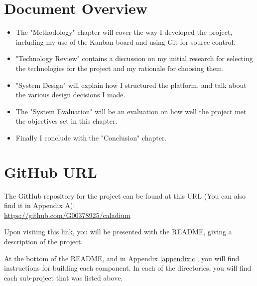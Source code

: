 
\section{Document Overview}
\begin{itemize}
  \item The "Methodology" chapter will cover the way I developed the project,
  including my use of the Kanban board and using Git for source control.
  \item "Technology Review" contains a discussion on my initial research for selecting
  the technologies for the project and my rationale for choosing them.
  \item "System Design" will explain how I structured the platform,
  and talk about the various design decisions I made.
  \item The "System Evaluation" will be an evaluation on how well
  the project met the objectives set in this chapter.
  \item Finally I conclude with the "Conclusion" chapter.
\end{itemize}

\section{GitHub URL}
The GitHub repository for the project can be found at this URL
(You can also find it in Appendix A):\\
\href{https://github.com/G00378925/caladium}{https://github.com/G00378925/caladium}

Upon visiting this link, you will be presented with the README,
giving a description of the project.

At the bottom of the README, and in Appendix \ref{appendix:c},
you will find instructions for building each component.
In each of the directories, you will find each sub-project that was listed above.
